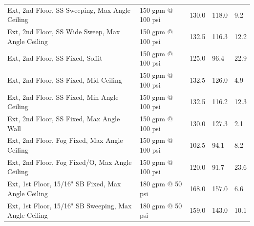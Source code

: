 \documentclass{article}
\begin{document}
\begin{table}[]
\begin{tabular}{lllll}
Ext, 2nd Floor, SS Sweeping, Max Angle Ceiling        & 150 gpm @ 100 psi                   & 130.0                                  & 118.0                                   & 9.2                                     \\
Ext, 2nd Floor, SS Wide Sweep, Max Angle Ceiling      & 150 gpm @ 100 psi                   & 132.5                                  & 116.3                                   & 12.2                                    \\
Ext, 2nd Floor, SS Fixed, Soffit                      & 150 gpm @ 100 psi                   & 125.0                                  & 96.4                                    & 22.9                                    \\
Ext, 2nd Floor, SS Fixed, Mid Ceiling                 & 150 gpm @ 100 psi                   & 132.5                                  & 126.0                                   & 4.9                                     \\
Ext, 2nd Floor, SS Fixed, Min Angle Ceiling           & 150 gpm @ 100 psi                   & 132.5                                  & 116.2                                   & 12.3                                    \\
Ext, 2nd Floor, SS Fixed, Max Angle Wall              & 150 gpm @ 100 psi                   & 130.0                                  & 127.3                                   & 2.1                                     \\
Ext, 2nd Floor, Fog Fixed, Max Angle Ceiling          & 150 gpm @ 100 psi                   & 102.5                                  & 94.1                                    & 8.2                                     \\
Ext, 2nd Floor, Fog Fixed/O, Max Angle Ceiling        & 150 gpm @ 100 psi                   & 120.0                                  & 91.7                                    & 23.6                                    \\
Ext, 1st Floor, 15/16" SB Fixed, Max Angle Ceiling    & 180 gpm @ 50 psi                    & 168.0                                  & 157.0                                   & 6.6                                     \\
Ext, 1st Floor, 15/16" SB Sweeping, Max Angle Ceiling & 180 gpm @ 50 psi                    & 159.0                                  & 143.0                                   & 10.1                                    \\

\end{tabular}
\end{table}
\end{document}
